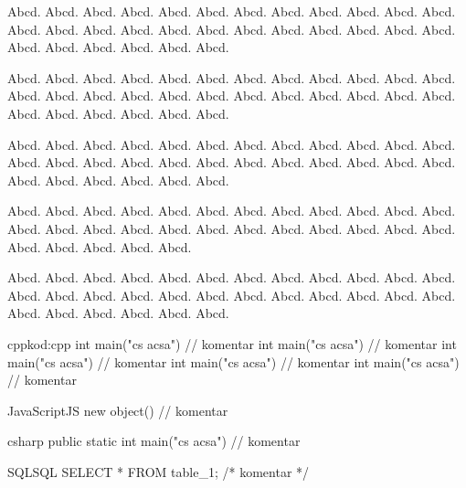 \documentclass[
  biblatex,
  glossaries,
  index
]{kidiplom}
\begin{document}
\begin{remark}
  Abcd. Abcd. Abcd. Abcd. Abcd. Abcd. Abcd. Abcd. Abcd. Abcd. Abcd. Abcd. Abcd. Abcd. Abcd. Abcd. Abcd. Abcd. Abcd. Abcd. Abcd. Abcd. Abcd. Abcd. Abcd. Abcd. Abcd. Abcd. Abcd. Abcd.
\end{remark}

\begin{example}
  Abcd. Abcd. Abcd. Abcd. Abcd. Abcd. Abcd. Abcd. Abcd. Abcd. Abcd. Abcd. Abcd. Abcd. Abcd. Abcd. Abcd. Abcd. Abcd. Abcd. Abcd. Abcd. Abcd. Abcd. Abcd. Abcd. Abcd. Abcd. Abcd. Abcd.
\end{example}

\begin{lemma}
  Abcd. Abcd. Abcd. Abcd. Abcd. Abcd. Abcd. Abcd. Abcd. Abcd. Abcd. Abcd. Abcd. Abcd. Abcd. Abcd. Abcd. Abcd. Abcd. Abcd. Abcd. Abcd. Abcd. Abcd. Abcd. Abcd. Abcd. Abcd. Abcd. Abcd.
\end{lemma}

\begin{consequence}
  Abcd. Abcd. Abcd. Abcd. Abcd. Abcd. Abcd. Abcd. Abcd. Abcd. Abcd. Abcd. Abcd. Abcd. Abcd. Abcd. Abcd. Abcd. Abcd. Abcd. Abcd. Abcd. Abcd. Abcd. Abcd. Abcd. Abcd. Abcd. Abcd.
\end{consequence}

\begin{theorem}
  Abcd. Abcd. Abcd. Abcd. Abcd. Abcd. Abcd. Abcd. Abcd. Abcd. Abcd. Abcd. Abcd. Abcd. Abcd. Abcd. Abcd. Abcd. Abcd. Abcd. Abcd. Abcd. Abcd. Abcd. Abcd. Abcd. Abcd. Abcd. Abcd. Abcd.
\end{theorem}


\begin{kicode}{cpp}{kod:cpp}{\cpp}
  int main("cs acsa") // komentar
  int main("cs acsa") // komentar
  int main("cs acsa") // komentar
  int main("cs acsa") // komentar
  int main("cs acsa") // komentar
\end{kicode}

\begin{kicode}{JavaScript}{}{JS}
  new object() // komentar
\end{kicode}

\begin{kicode}{csharp}{}{\csharp}
  public static int main("cs acsa") // komentar
\end{kicode}

\begin{kicode}{SQL}{}{SQL}
  SELECT * FROM table_1; /* komentar */
\end{kicode}
\end{document}
